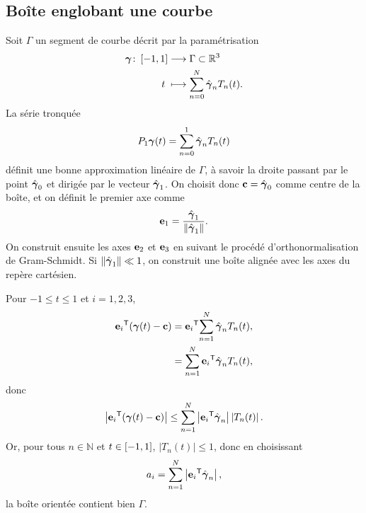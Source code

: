 \subsection{Boîte englobant une courbe}
Soit $\Gamma$ un segment de courbe décrit par la paramétrisation 
\begin{align}
  \boldsymbol{\gamma} \colon \left[ -1, 1 \right] &\longrightarrow \Gamma \subset \mathbb{R}^3 \nonumber \\
  t\; &\longmapsto \sum_{n=0}^{N} \hat{\boldsymbol{\gamma}}_n T_n(t).
\end{align}
%
La série tronquée
\begin{equation}
	P_{1}{\boldsymbol{\gamma}}(t) = \sum_{n=0}^{1} \hat{\boldsymbol{\gamma}}_n T_n(t)
\end{equation}
définit une bonne approximation linéaire de $\Gamma$, à savoir la droite passant par le point $\hat{\boldsymbol{\gamma}}_0$ et dirigée par le vecteur $\hat{\boldsymbol{\gamma}}_1$. 
On choisit donc $\mathbf{c} = \hat{\boldsymbol{\gamma}}_0$ comme centre de la boîte, et on définit le premier axe comme
\begin{equation}
	\mathbf{e}_1 = \frac{\hat{\boldsymbol{\gamma}}_1}{\left\| {\hat{\boldsymbol{\gamma}}_1} \right\|}.
\end{equation}
On construit ensuite les axes $\mathbf{e}_2$ et $\mathbf{e}_3$ en suivant le procédé d'orthonormalisation de Gram-Schmidt. Si $\left\| {\hat{\boldsymbol{\gamma}}_1} \right\| \ll 1$, on construit une boîte alignée avec les axes du repère cartésien.
\par
Pour $-1 \leq t \leq 1$ et $i=1,2,3$,
\begin{align*}
	{\mathbf{e}_i} ^\mathsf{T} {\left( \boldsymbol{\gamma}(t) - \mathbf{c} \right)} 
	&= {\mathbf{e}_i} ^\mathsf{T} {\sum_{n=1}^{N} \hat{\boldsymbol{\gamma}}_n T_n(t)} ,\\
	&= \sum_{n=1}^{N}{\mathbf{e}_i} ^\mathsf{T} {\hat{\boldsymbol{\gamma}}_n} T_n(t),
\end{align*}
donc
\begin{equation*}
	\left| {\mathbf{e}_i} ^\mathsf{T} {\left( \boldsymbol{\gamma}(t) - \mathbf{c} \right)} \right| 
	\leq \sum_{n=1}^{N} \left|{\mathbf{e}_i} ^\mathsf{T} {\hat{\boldsymbol{\gamma}}_n}\right| \left| T_n(t) \right|.
\end{equation*}
Or, pour tous $n \in \mathbb{N}$ et $t \in \left[ -1, 1 \right]$, $\left| T_n(t) \right| \leq 1$, 
donc en choisissant
\begin{equation}
	a_i = \sum_{n=1}^{N} \left|{\mathbf{e}_i} ^\mathsf{T} {\hat{\boldsymbol{\gamma}}_n}\right|,
\end{equation}
la boîte orientée contient bien $\Gamma$.


